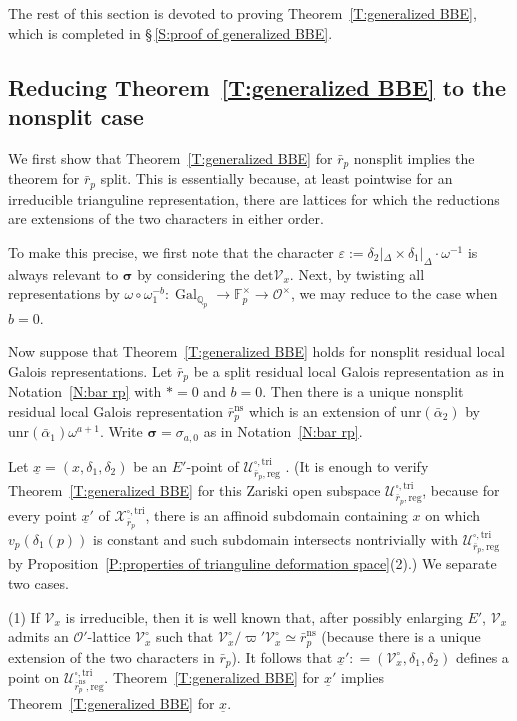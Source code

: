\documentclass[12pt]{amsart}
\theoremstyle{definition}
\numberwithin{equation}{subsection}
\def\calO{\mathcal{O}}
\def\calU{\mathcal{U}}
\def\calV{\mathcal{V}}
\def\calX{\mathcal{X}}
\def\FF{\mathbb{F}}
\def\QQ{\mathbb{Q}}
\DeclareMathOperator{\Gal}{Gal}
\newcommand{\bbsigma}{\boldsymbol{\sigma}}
\renewcommand{\det}{\mathrm{det}}
\newcommand{\unr}{\mathrm{unr}}
\newcommand{\tri}{\mathrm{tri}}
\newcommand{\reg}{\mathrm{reg}}
\begin{document}
The rest of this section is devoted to proving Theorem~\ref{T:generalized BBE}, which is completed in \S\,\ref{S:proof of generalized BBE}. 



\subsection{Reducing Theorem~\ref{T:generalized BBE} to the nonsplit case}
\label{S:reduction to nonsplit case}
We first show that Theorem~\ref{T:generalized BBE} for $\bar r_p$ nonsplit implies the theorem for $\bar r_p$ split. This is essentially because, at least pointwise for an irreducible trianguline representation, there are lattices for which the reductions are extensions of the two characters in either order.

To make this precise, we first note that the character $\varepsilon :=\delta_2|_\Delta \times \delta_1|_{\Delta}\cdot \omega^{-1}$ is always relevant to  $\bbsigma$ by considering the $\det \calV_x$. Next, by twisting all representations by $\omega \circ \omega_1^{-b}: \Gal_{\QQ_p} \to \FF_p^\times \to \calO^\times$, we may reduce to the case when $b=0$.

Now suppose that Theorem~\ref{T:generalized BBE} holds for nonsplit residual local Galois representations. Let $\bar r_p$ be a split residual local Galois representation as in Notation~\ref{N:bar rp} with $*=0$ and $b=0$. Then there is a unique nonsplit residual local Galois representation $\bar r_p^\mathrm{ns}$  which is an extension of $\unr(\bar \alpha_2)$ by $\unr(\bar \alpha_1) \omega^{a+1}$. Write $\bbsigma = \sigma_{a,0}$ as in Notation~\ref{N:bar rp}.

Let $\underline x = (x,\delta_1, \delta_2)$ be an $E'$-point of $\calU_{\bar r_p, \reg}^{\square, \tri}$ . (It is enough to verify Theorem~\ref{T:generalized BBE} for this Zariski open subspace $\calU_{\bar r_p, \reg}^{\square, \tri}$, because for every point $\underline x'$ of $\calX_{\bar r_p}^{\square, \tri}$, there is an affinoid subdomain containing $x$ on which $v_p(\delta_1(p))$ is constant and such subdomain intersects nontrivially with $\calU_{\bar r_p, \reg}^{\square, \tri}$ by Proposition~\ref{P:properties of trianguline deformation space}(2).)
We separate two cases.

(1) If $\calV_x$ is irreducible, then it is well known that, after possibly enlarging $E'$, $\calV_x$ admits an $\calO'$-lattice $\calV^\circ_x$ such that $
\calV_x^\circ / \varpi'\calV_x^\circ \simeq  \bar r_p^\mathrm{ns}$ (because there is a unique extension of the two characters in $\bar r_p$). It follows that $\underline x': = (\calV^\circ_x, \delta_1, \delta_2)$ defines a point on $\calU_{\bar r_p^\mathrm{ns}, \reg}^{\square, \tri}$. Theorem~\ref{T:generalized BBE} for $\underline x'$ implies Theorem~\ref{T:generalized BBE} for $\underline x$.
\end{document}
